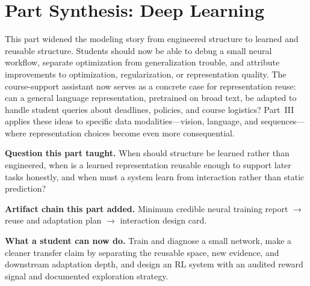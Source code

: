 \chapter*{Part Synthesis: Deep Learning}

\begin{whychaptermatters}
This part widened the modeling story from engineered structure to learned and reusable structure. Students should now be able to debug a small neural workflow, separate optimization from generalization trouble, and attribute improvements to optimization, regularization, or representation quality. The course-support assistant now serves as a concrete case for representation reuse: can a general language representation, pretrained on broad text, be adapted to handle student queries about deadlines, policies, and course logistics? Part~III applies these ideas to specific data modalities---vision, language, and sequences---where representation choices become even more consequential.
\end{whychaptermatters}

\begin{chaptersummary}
\item \textbf{Question this part taught.} When should structure be learned rather than engineered, when is a learned representation reusable enough to support later tasks honestly, and when must a system learn from interaction rather than static prediction?
\item \textbf{Artifact chain this part added.} Minimum credible neural training report $\rightarrow$ reuse and adaptation plan $\rightarrow$ interaction design card.
\item \textbf{What a student can now do.} Train and diagnose a small network, make a cleaner transfer claim by separating the reusable space, new evidence, and downstream adaptation depth, and design an RL system with an audited reward signal and documented exploration strategy.
\end{chaptersummary}

